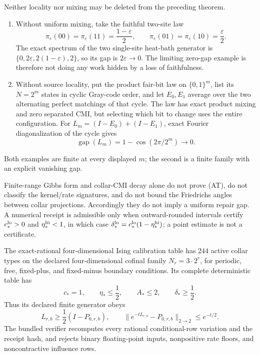 \begin{proposition}
\label{prop:repair-gap-countermodels}
Neither locality nor mixing may be deleted from the preceding theorem.
\begin{enumerate}[label=(\roman*)]
\item Without uniform mixing, take the faithful two-site law
\[
\pi_\varepsilon(00)=\pi_\varepsilon(11)=\frac{1-\varepsilon}{2},
\qquad
\pi_\varepsilon(01)=\pi_\varepsilon(10)=\frac{\varepsilon}{2}.
\]
The exact spectrum of the two single-site heat-bath generator is
\(\{0,2\varepsilon,2(1-\varepsilon),2\}\), so its gap is
\(2\varepsilon\to0\).  The limiting zero-gap example is therefore not doing
any work hidden by a loss of faithfulness.
\item Without source locality, put the product fair-bit law on \(\{0,1\}^m\), list its
\(N=2^m\) states in cyclic Gray-code order, and let \(E_0,E_1\) average over the two alternating
perfect matchings of that cycle.  The law has exact product mixing and zero separated CMI, but
selecting which bit to change uses the entire configuration.  For
\(L_m=(I-E_0)+(I-E_1)\), exact Fourier diagonalization of the cycle gives
\[
\operatorname{gap}(L_m)=1-\cos(2\pi/2^m)\longrightarrow0.
\]
\end{enumerate}
Both examples are finite at every displayed \(m\); the second is a finite family with an explicit
vanishing gap.
\end{proposition}

\begin{remark}
Finite-range Gibbs form and collar-CMI decay alone do not prove \textup{(AT)}, do not classify the
kernel/rate signatures, and do not bound the Friedrichs angles between collar projections.
Accordingly they do not imply a uniform repair gap.  A numerical receipt is admissible only when
outward-rounded intervals certify \(c_*^{\rm lo}>0\) and \(\eta_*^{\rm hi}<1\), in which case
\(\delta_*^{\rm lo}=c_*^{\rm lo}(1-\eta_*^{\rm hi})\); a point estimate is not a certificate.
\end{remark}

\begin{proposition}
\label{prop:collar-gap-calibration}
The exact-rational four-dimensional Ising calibration table
has \(244\) active collar types on the declared four-dimensional cofinal family
\(N_r=3\cdot2^r\), for periodic, free, fixed-plus, and fixed-minus boundary
conditions.  Its complete deterministic table has
\[
c_*=1,\qquad \eta_*\le\frac12,\qquad A_*\le2,
\qquad \delta_*\ge\frac12.
\]
Thus its declared finite generator obeys
\[
L_{r,b}\ge\frac12(I-P_{0,r,b}),\qquad
\|e^{-tL_{r,b}}-P_{0,r,b}\|_{2\to2}\le e^{-t/2}.
\]
The bundled verifier recomputes every rational conditional-row variation and
the receipt hash, and rejects binary floating-point inputs, nonpositive rate
floors, and noncontractive influence rows.
\end{proposition}

